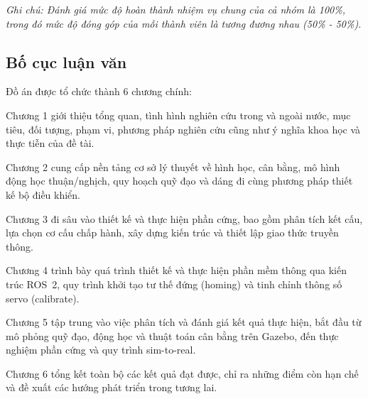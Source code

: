\textit{Ghi chú: Đánh giá mức độ hoàn thành nhiệm vụ chung của cả nhóm là 100\%, trong đó mức độ đóng góp của mỗi thành viên là tương đương nhau (50\% - 50\%).}

\subsection{Bố cục luận văn}

Đồ án được tổ chức thành 6 chương chính:

Chương 1 giới thiệu tổng quan, tình hình nghiên cứu trong và ngoài nước, mục tiêu, đối tượng, phạm vi, phương pháp nghiên cứu cũng như ý nghĩa khoa học và thực tiễn của đề tài. 

Chương 2 cung cấp nền tảng cơ sở lý thuyết về hình học, cân bằng, mô hình động học thuận/nghịch, quy hoạch quỹ đạo và dáng đi cùng phương pháp thiết kế bộ điều khiển. 

Chương 3 đi sâu vào thiết kế và thực hiện phần cứng, bao gồm phân tích kết cấu, lựa chọn cơ cấu chấp hành, xây dựng kiến trúc và thiết lập giao thức truyền thông. 

Chương 4 trình bày quá trình thiết kế và thực hiện phần mềm thông qua kiến trúc ROS~2, quy trình khởi tạo tư thế đứng (homing) và tinh chỉnh thông số servo (calibrate). 

Chương 5 tập trung vào việc phân tích và đánh giá kết quả thực hiện, bắt đầu từ mô phỏng quỹ đạo, động học và thuật toán cân bằng trên Gazebo, đến thực nghiệm phần cứng và quy trình sim-to-real. 

Chương 6 tổng kết toàn bộ các kết quả đạt được, chỉ ra những điểm còn hạn chế và đề xuất các hướng phát triển trong tương lai.

